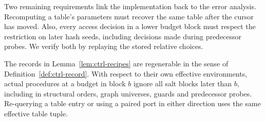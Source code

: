 Two remaining requirements link the implementation back to the error analysis. Recomputing a table's parameters must recover the same table after the cursor has moved. Also, every access decision in a lower budget block must respect the restriction on later hash seeds, including decisions made during predecessor probes. We verify both by replaying the stored relative choices.

\begin{lemma}\label{lem:ctrl-replay}
The records in Lemma~\ref{lem:ctrl-recipes} are regenerable in the sense
of Definition~\ref{def:ctrl-record}.  With respect to their own effective
environments, actual procedures at a budget in block $b$ ignore all salt
blocks later than $b$, including in structural orders, graph universes,
guards and predecessor probes.  Re-querying a
table entry or using a paired port in either direction uses the same
effective table tuple.
\end{lemma}

